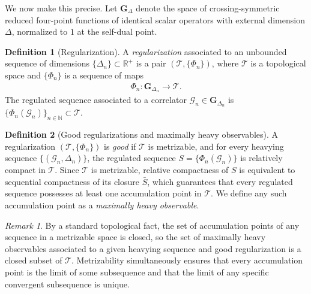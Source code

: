 \documentclass[a4paper,11pt]{article}
\theoremstyle{plain}
\theoremstyle{definition}
\newtheorem{defn}{Definition}[section]
\theoremstyle{remark}
\newtheorem*{rem}{Remark}
\newcommand{\ba}{\begin{equation} \begin{aligned}}
\newcommand{\ea}{\end{aligned} \end{equation}}
\newcommand{\mbf}{\mathbf}
\newcommand{\De}{\Delta}
\begin{document}
We now make this precise. Let $\mbf{G}_{\De}$ denote the space of crossing-symmetric reduced four-point functions of identical scalar operators with external dimension $\De$, normalized to $1$ at the self-dual point.
 
\begin{defn}[Regularization]
\label{def:regularization}
A \textit{regularization} associated to an unbounded sequence of dimensions $\{\De_n\} \subset \mathbb{R}^+$ is a pair $(\mathcal{T}, \{\Phi_n\})$, where $\mathcal{T}$ is a topological space and $\{\Phi_n\}$ is a sequence of maps
\ba
\Phi_n :  \mbf{G}_{\De_n} \to \mathcal{T}.
\ea
The regulated sequence associated to a correlator $\mathcal{G}_n \in \mbf{G}_{\De_n}$ is $\{\Phi_n(\mathcal{G}_n)\}_{n \in \mathbb{N}} \subset \mathcal{T}$.
\end{defn}
 
\begin{defn}[Good regularizations and maximally heavy observables]
\label{def:goodreg}
A regularization $(\mathcal{T}, \{\Phi_n\})$ is \textit{good} if $\mathcal{T}$ is metrizable, and for every heavying sequence $\{(\mathcal{G}_n, \De_n)\}$, the regulated sequence $S = \{\Phi_n(\mathcal{G}_n)\}$ is relatively compact in $\mathcal{T}$. Since $\mathcal{T}$ is metrizable, relative compactness of $S$ is equivalent to sequential compactness of its closure $\bar{S}$, which guarantees that every regulated sequence possesses at least one accumulation point in $\mathcal{T}$. We define any such accumulation point as a \textit{maximally heavy observable}.
\end{defn}

\begin{rem}
By a standard topological fact, the set of accumulation points of any sequence in a metrizable space is closed, so the set of maximally heavy observables associated to a given heavying sequence and good regularization is a closed subset of $\mathcal{T}$. Metrizability simultaneously ensures that every accumulation point is the limit of some subsequence and that the limit of any specific convergent subsequence is unique.
\end{rem}
\end{document}
